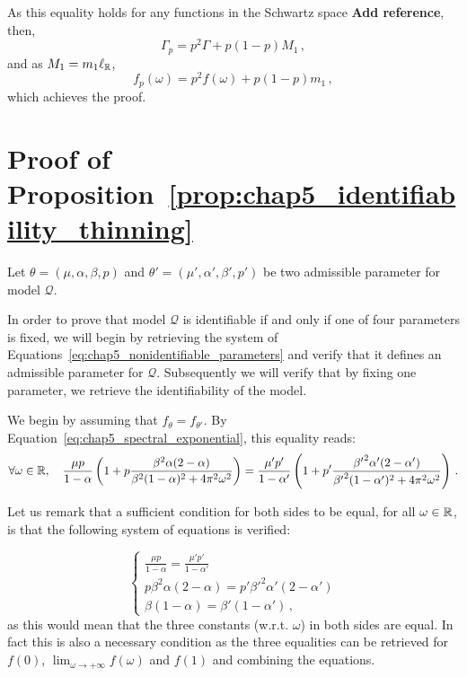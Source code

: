 \begin{subappendices}
        As this equality holds for any functions in the Schwartz space \textbf{Add reference}, then,
        \[\Gamma_p = p^2 \Gamma + p(1-p) M_1\,,\]
        and as $M_1 = m_1 \ell_{{\mathbb R}}$,
        \[f_p(\omega) = p^2 f(\omega) + p(1-p) m_1\,,\]
        which achieves the proof.





    \section{Proof of Proposition~\ref{prop:chap5_identifiability_thinning}}\label{appendix:chap5_proof_identifiability_thinning}

    Let $\theta = (\mu, \alpha, \beta, p)$ and $\theta' = (\mu', \alpha', \beta', p')$ be two admissible parameter for model $\mathcal{Q}$.

    In order to prove that model $\mathcal{Q}$ is identifiable if and only if one of four parameters is fixed, 
    we will begin by retrieving the system of Equations~\eqref{eq:chap5_nonidentifiable_parameters}
    and verify that it defines an admissible parameter for $\mathcal{Q}$.
    Subsequently we will verify that by fixing one parameter, we retrieve the identifiability of the model.
    
    We begin by assuming that $f_\theta = f_{\theta'}$.
    By Equation~\eqref{eq:chap5_spectral_exponential}, this equality reads:
    \[\forall \omega \in {\mathbb R},\quad 
    \frac{\mu p }{1-\alpha}\left(1 + p \frac{\beta^2 \alpha (2-\alpha)}{\beta^2(1-\alpha)^2 + 4 \pi^2 \omega^2}\right) = 
    \frac{\mu' p' }{1-\alpha'}\left(1 + p' \frac{{\beta'}^2 \alpha' (2-\alpha')}{{\beta'}^2(1-\alpha')^2 + 4 \pi^2 \omega^2}\right)\,.
    \]

    Let us remark that a sufficient condition for both sides to be equal, 
    for all $\omega \in {\mathbb R}$,
    is that the following system of equations is verified:

    \begin{equation}\label{eq:chap5_system_identifiability}
        \begin{cases}
            \frac{\mu p }{1-\alpha} = \frac{\mu' p'}{1-\alpha'}\\
            p \beta^2 \alpha(2-\alpha) = p' {\beta'}^2 \alpha'(2-\alpha')\\
            \beta (1-\alpha) = \beta' (1-\alpha')\,,
        \end{cases}
    \end{equation}
    as this would mean that the three constants (w.r.t. $\omega$) in both sides are equal.
    In fact this is also a necessary condition as the three equalities can be retrieved for $f(0)$, $\lim_{\omega\to+\infty}{f(\omega)}$ and $f(1)$
    and combining the equations.


\end{subappendices}
